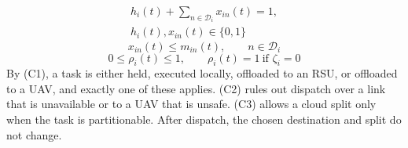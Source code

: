 \begin{equation}
\begin{gathered}
h_i(t)+\sum_{n\in\mathcal D_i}x_{in}(t)=1,\\
h_i(t),x_{in}(t)\in\{0,1\}
\end{gathered}
\tag{C1}\label{con:routing}
\end{equation}
\begin{equation}
x_{in}(t)\le m_{in}(t),\qquad n\in\mathcal D_i
\tag{C2}\label{con:mask}
\end{equation}
\begin{equation}
0\le\rho_i(t)\le1,\qquad
\rho_i(t)=1\ \text{if }\zeta_i=0
\tag{C3}\label{con:split}
\end{equation}
By (C1), a task is either held, executed locally, offloaded to an RSU, or
offloaded to a UAV, and exactly one of these applies. (C2) rules out dispatch
over a link that is unavailable or to a UAV that is unsafe. (C3) allows a
cloud split only when the task is partitionable. After dispatch, the chosen
destination and split do not change.

